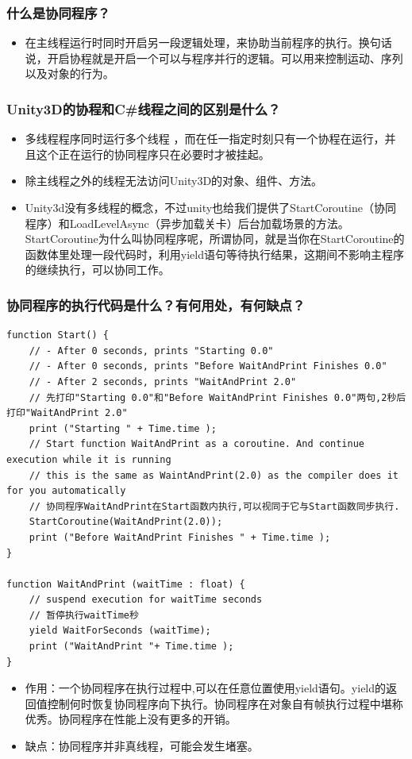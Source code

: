 \documentclass[9pt, b5paper]{article}
\begin{document}
\subsubsection{什么是协同程序？}
\label{sec:org3ea341f}
\begin{itemize}
\item 在主线程运行时同时开启另一段逻辑处理，来协助当前程序的执行。换句话说，开启协程就是开启一个可以与程序并行的逻辑。可以用来控制运动、序列以及对象的行为。
\end{itemize}

\subsubsection{Unity3D的协程和C\#线程之间的区别是什么？}
\label{sec:orgda7293b}
\begin{itemize}
\item 多线程程序同时运行多个线程 ，而在任一指定时刻只有一个协程在运行，并且这个正在运行的协同程序只在必要时才被挂起。
\item 除主线程之外的线程无法访问Unity3D的对象、组件、方法。
\item Unity3d没有多线程的概念，不过unity也给我们提供了StartCoroutine（协同程序）和LoadLevelAsync（异步加载关卡）后台加载场景的方法。 StartCoroutine为什么叫协同程序呢，所谓协同，就是当你在StartCoroutine的函数体里处理一段代码时，利用yield语句等待执行结果，这期间不影响主程序的继续执行，可以协同工作。
\end{itemize}

\subsubsection{协同程序的执行代码是什么？有何用处，有何缺点？}
\label{sec:orgaca3287}
\begin{verbatim}
function Start() { 
    // - After 0 seconds, prints "Starting 0.0"
    // - After 0 seconds, prints "Before WaitAndPrint Finishes 0.0"
    // - After 2 seconds, prints "WaitAndPrint 2.0"
    // 先打印"Starting 0.0"和"Before WaitAndPrint Finishes 0.0"两句,2秒后打印"WaitAndPrint 2.0"
    print ("Starting " + Time.time );
    // Start function WaitAndPrint as a coroutine. And continue execution while it is running
    // this is the same as WaintAndPrint(2.0) as the compiler does it for you automatically
    // 协同程序WaitAndPrint在Start函数内执行,可以视同于它与Start函数同步执行.
    StartCoroutine(WaitAndPrint(2.0)); 
    print ("Before WaitAndPrint Finishes " + Time.time );
}

function WaitAndPrint (waitTime : float) {
    // suspend execution for waitTime seconds
    // 暂停执行waitTime秒
    yield WaitForSeconds (waitTime);
    print ("WaitAndPrint "+ Time.time );
}
\end{verbatim}
\begin{itemize}
\item 作用：一个协同程序在执行过程中,可以在任意位置使用yield语句。yield的返回值控制何时恢复协同程序向下执行。协同程序在对象自有帧执行过程中堪称优秀。协同程序在性能上没有更多的开销。
\item 缺点：协同程序并非真线程，可能会发生堵塞。
\end{itemize}
\end{document}
